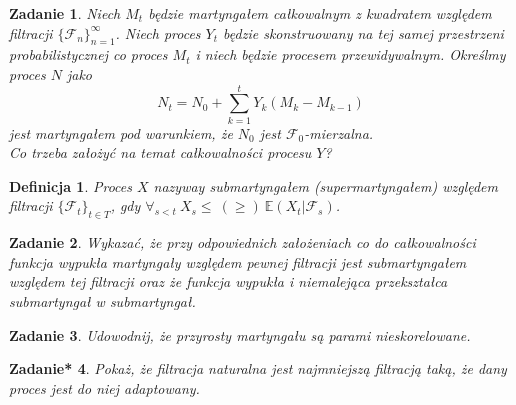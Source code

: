 \documentclass{mwart}
\newtheorem{df}{Definicja}
\newtheorem{zd}{Zadanie}
\newtheorem{zdt}[zd]{Zadanie*}
\begin{document}
\begin{zd}
Niech $M_t$ będzie martyngałem całkowalnym z kwadratem względem filtracji $\{\mathcal{F}_n\}_{n=1}^{\infty}$. Niech proces $Y_t$ będzie skonstruowany na tej samej przestrzeni probabilistycznej co proces $M_t$ i niech będzie procesem przewidywalnym. Określmy proces $N$ jako
\begin{displaymath}
N_t = N_0 + \sum_{k=1}^tY_k\left(M_k - M_{k-1}\right)
\end{displaymath}
jest martyngałem pod warunkiem, że $N_0$ jest $\mathcal{F}_0$-mierzalna.\\
Co trzeba założyć na temat całkowalności procesu $Y$?
\end{zd}

\begin{df}
Proces $X$ nazyway submartyngałem (supermartyngałem) względem filtracji $\{\mathcal{F}_t\}_{t\in T}$, gdy $\forall_{s <t}\ X_s \leq \ (\geq)\ \mathbb{E}\left(X_t|\mathcal{F}_s\right)$.
\end{df}

\begin{zd}
Wykazać, że przy odpowiednich założeniach co do całkowalności funkcja wypukła martyngały względem pewnej filtracji jest submartyngałem względem tej filtracji oraz że funkcja wypukła i niemalejąca przekształca submartyngał w submartyngał.
\end{zd}

\begin{zd}
Udowodnij, że przyrosty martyngału są parami nieskorelowane.
\end{zd}

\begin{zdt}
Pokaż, że filtracja naturalna jest najmniejszą filtracją taką, że dany proces jest do niej adaptowany.
\end{zdt}
\end{document}
